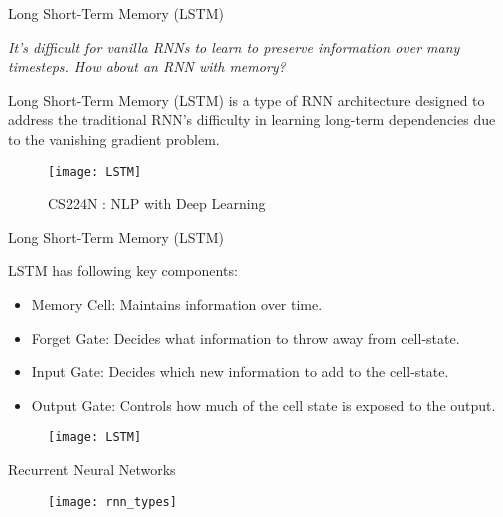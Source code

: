 \documentclass[10pt]{beamer}
\begin{document}
\begin{frame}[fragile]{Long Short-Term Memory (LSTM)}

	\textit{It’s difficult for vanilla RNNs to learn to preserve information over many timesteps. How about an RNN with
		memory?}

	Long Short-Term Memory (LSTM) is a type of RNN architecture designed to address the traditional RNN's difficulty
	in learning long-term dependencies due to the vanishing gradient problem.

	\begin{figure}[h]
		\centering
		\texttt{[image: LSTM]}
		\caption{CS224N : NLP with Deep Learning}
	\end{figure}

\end{frame}


\begin{frame}[fragile]{Long Short-Term Memory (LSTM)}

	LSTM has following key components:

	\begin{itemize}
		\item Memory Cell: Maintains information over time.
		\item Forget Gate: Decides what information to throw away from cell-state.
		\item Input Gate: Decides which new information to add to the cell-state.
		\item Output Gate: Controls how much of the cell state is exposed to the output.
	\end{itemize}

	\begin{figure}[h]
		\centering
		\texttt{[image: LSTM]}
	\end{figure}

\end{frame}



\begin{frame}[fragile]{Recurrent Neural Networks}

	\begin{figure}[h]
		\centering
		\texttt{[image: rnn\_types]}
	\end{figure}

\end{frame}
\end{document}
